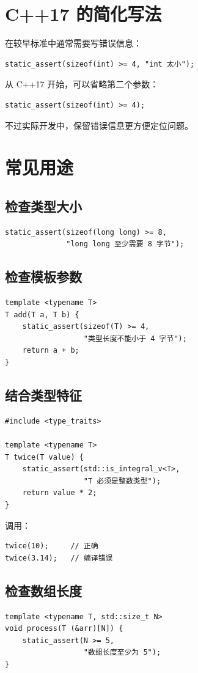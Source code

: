 \documentclass[UTF8,12pt,a4paper]{ctexart}
\begin{document}
\section{C++17 的简化写法}
在较早标准中通常需要写错误信息：
\begin{lstlisting}
static_assert(sizeof(int) >= 4, "int 太小");
\end{lstlisting}
从 C++17 开始，可以省略第二个参数：
\begin{lstlisting}
static_assert(sizeof(int) >= 4);
\end{lstlisting}
不过实际开发中，保留错误信息更方便定位问题。

\section{常见用途}
\subsection{检查类型大小}
\begin{lstlisting}
static_assert(sizeof(long long) >= 8,
              "long long 至少需要 8 字节");
\end{lstlisting}

\subsection{检查模板参数}
\begin{lstlisting}
template <typename T>
T add(T a, T b) {
    static_assert(sizeof(T) >= 4,
                  "类型长度不能小于 4 字节");
    return a + b;
}
\end{lstlisting}

\subsection{结合类型特征}
\begin{lstlisting}
#include <type_traits>

template <typename T>
T twice(T value) {
    static_assert(std::is_integral_v<T>,
                  "T 必须是整数类型");
    return value * 2;
}
\end{lstlisting}
调用：
\begin{lstlisting}
twice(10);     // 正确
twice(3.14);   // 编译错误
\end{lstlisting}

\subsection{检查数组长度}
\begin{lstlisting}
template <typename T, std::size_t N>
void process(T (&arr)[N]) {
    static_assert(N >= 5,
                  "数组长度至少为 5");
}
\end{lstlisting}
\end{document}
